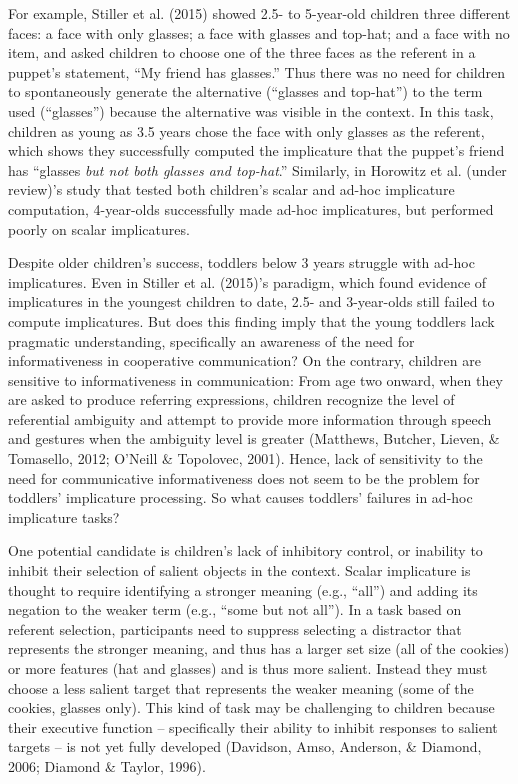 \documentclass[a4paper,man,apacite,floatsintext]{apa6}
\begin{document}
For example, Stiller et al. (2015) showed 2.5- to 5-year-old children
three different faces: a face with only glasses; a face with glasses and
top-hat; and a face with no item, and asked children to choose one of
the three faces as the referent in a puppet's statement, ``My friend has
glasses.'' Thus there was no need for children to spontaneously generate
the alternative (``glasses and top-hat'') to the term used (``glasses'')
because the alternative was visible in the context. In this task,
children as young as 3.5 years chose the face with only glasses as the
referent, which shows they successfully computed the implicature that
the puppet's friend has ``glasses \emph{but not both glasses and
top-hat}.'' Similarly, in Horowitz et al. (under review)'s study that
tested both children's scalar and ad-hoc implicature computation,
4-year-olds successfully made ad-hoc implicatures, but performed poorly
on scalar implicatures.

Despite older children's success, toddlers below 3 years struggle with
ad-hoc implicatures. Even in Stiller et al. (2015)'s paradigm, which
found evidence of implicatures in the youngest children to date, 2.5-
and 3-year-olds still failed to compute implicatures. But does this
finding imply that the young toddlers lack pragmatic understanding,
specifically an awareness of the need for informativeness in cooperative
communication? On the contrary, children are sensitive to
informativeness in communication: From age two onward, when they are
asked to produce referring expressions, children recognize the level of
referential ambiguity and attempt to provide more information through
speech and gestures when the ambiguity level is greater (Matthews,
Butcher, Lieven, \& Tomasello, 2012; O'Neill \& Topolovec, 2001). Hence,
lack of sensitivity to the need for communicative informativeness does
not seem to be the problem for toddlers' implicature processing. So what
causes toddlers' failures in ad-hoc implicature tasks?

One potential candidate is children's lack of inhibitory control, or
inability to inhibit their selection of salient objects in the context.
Scalar implicature is thought to require identifying a stronger meaning
(e.g., ``all'') and adding its negation to the weaker term (e.g., ``some
but not all''). In a task based on referent selection, participants need
to suppress selecting a distractor that represents the stronger meaning,
and thus has a larger set size (all of the cookies) or more features
(hat and glasses) and is thus more salient. Instead they must choose a
less salient target that represents the weaker meaning (some of the
cookies, glasses only). This kind of task may be challenging to children
because their executive function -- specifically their ability to
inhibit responses to salient targets -- is not yet fully developed
(Davidson, Amso, Anderson, \& Diamond, 2006; Diamond \& Taylor, 1996).
\end{document}
